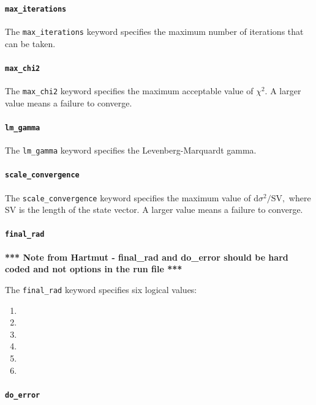 \documentclass{article}
\begin{document}
\paragraph{\texttt{max\_iterations}}

The \texttt{max\_iterations} keyword specifies the maximum number of
iterations that can be taken.

\paragraph{\texttt{max\_chi2}}

The \texttt{max\_chi2} keyword specifies the maximum acceptable value
of $\chi^2.$  A larger value means a failure to converge.

\paragraph{\texttt{lm\_gamma}}

The \texttt{lm\_gamma} keyword specifies the Levenberg-Marquardt gamma.

\paragraph{\texttt{scale\_convergence}}

The \texttt{scale\_convergence} keyword specifies the maximum value of
$\textrm{d}\sigma^2/\textrm{SV},$ where SV is the length of the state
vector.  A larger value means a failure to converge.

\paragraph{\texttt{final\_rad}}

\textbf{*** Note from Hartmut - final\_rad and do\_error should be hard
  coded and not options in the run file ***}


The \texttt{final\_rad} keyword specifies six logical values:
\begin{enumerate}
\item
\item
\item
\item
\item
\item
\end{enumerate}

\paragraph{\texttt{do\_error}}
\end{document}
